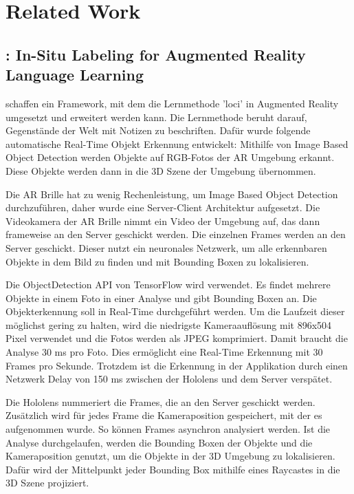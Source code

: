 \section{Related Work}

\subsection{\cite{LabelingLanguageLearning}: In-Situ Labeling for Augmented Reality Language Learning}
\cite{LabelingLanguageLearning} schaffen ein Framework, mit dem die Lernmethode 'loci' in Augmented Reality umgesetzt und erweitert werden kann. Die Lernmethode beruht darauf, Gegenstände der Welt mit Notizen zu beschriften. Dafür wurde folgende automatische Real-Time Objekt Erkennung entwickelt: Mithilfe von Image Based Object Detection werden Objekte auf RGB-Fotos der AR Umgebung erkannt. Diese Objekte werden dann in die 3D Szene der Umgebung übernommen. 

Die AR Brille hat zu wenig Rechenleistung, um Image Based Object Detection durchzuführen, daher wurde eine Server-Client Architektur aufgesetzt. Die Videokamera der AR Brille nimmt ein Video der Umgebung auf, das dann frameweise an den Server geschickt werden. Die einzelnen Frames werden an den Server geschickt. Dieser nutzt ein neuronales Netzwerk, um alle erkennbaren Objekte in dem Bild zu finden und mit Bounding Boxen zu lokalisieren.

Die ObjectDetection API von TensorFlow wird verwendet. Es findet mehrere Objekte in einem Foto in einer Analyse und gibt Bounding Boxen an. Die Objekterkennung soll in Real-Time durchgeführt werden. Um die Laufzeit dieser möglichst gering zu halten, wird die niedrigste Kameraauflösung mit 896x504 Pixel verwendet und die Fotos werden als JPEG komprimiert. Damit braucht die Analyse 30 ms pro Foto. Dies ermöglicht eine Real-Time Erkennung mit 30 Frames pro Sekunde. Trotzdem ist die Erkennung in der Applikation durch einen Netzwerk Delay von 150 ms zwischen der Hololens und dem Server verspätet.

Die Hololens nummeriert die Frames, die an den Server geschickt werden. Zusätzlich wird für jedes Frame die Kameraposition gespeichert, mit der es aufgenommen wurde. So können Frames asynchron analysiert werden. Ist die Analyse durchgelaufen, werden die Bounding Boxen der Objekte und die Kameraposition genutzt, um die Objekte in der 3D Umgebung zu lokalisieren. Dafür wird der Mittelpunkt jeder Bounding Box mithilfe eines Raycastes in die 3D Szene projiziert.

